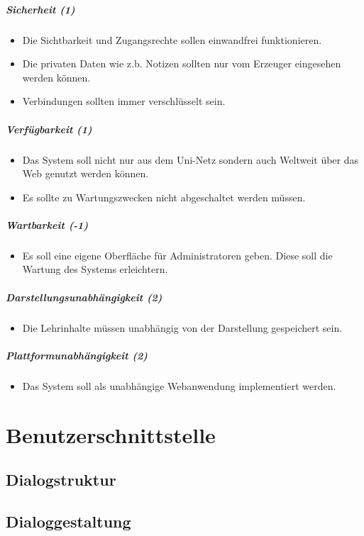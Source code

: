 \documentclass[12pt,a4paper]{article}
\begin{document}
{\subparagraph{Sicherheit (1)}
\begin{itemize}
\item Die Sichtbarkeit und Zugangsrechte sollen einwandfrei funktionieren.
\item Die privaten Daten wie z.b. Notizen sollten nur vom Erzeuger eingesehen werden können.
\item Verbindungen sollten immer verschlüsselt sein.
\end{itemize}
\subparagraph{Verfügbarkeit (1)}
\begin{itemize}
\item Das System soll nicht nur aus dem Uni-Netz sondern auch Weltweit über das Web genutzt werden können.
\item Es sollte zu Wartungszwecken nicht abgeschaltet werden müssen.
\end{itemize}
\subparagraph{Wartbarkeit (-1)}
\begin{itemize}
\item Es soll eine eigene Oberfläche für Administratoren geben. Diese soll  die Wartung des Systems erleichtern.
\end{itemize}
\subparagraph{Darstellungsunabhängigkeit (2)}
\begin{itemize}
\item Die Lehrinhalte müssen unabhängig von der Darstellung gespeichert sein.
\end{itemize}
\subparagraph{Plattformunabhängigkeit (2)}
\begin{itemize}
\item Das System soll als unabhängige Webanwendung implementiert werden.
\end{itemize}



\section{Benutzerschnittstelle}
\subsection{Dialogstruktur}


\subsection{Dialoggestaltung}

\begin{figure}[H]
	\centering

\end{figure}}
\end{document}

